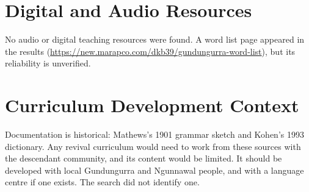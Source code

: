 \documentclass[12pt]{article}
\begin{document}
\section{Digital and Audio Resources}
No audio or digital teaching resources were found. A word list page appeared in the results (\url{https://new.marapco.com/dkb39/gundungurra-word-list}), but its reliability is unverified.

\section{Curriculum Development Context}
Documentation is historical: Mathews's 1901 grammar sketch and Kohen's 1993 dictionary. Any revival curriculum would need to work from these sources with the descendant community, and its content would be limited. It should be developed with local Gundungurra and Ngunnawal people, and with a language centre if one exists. The search did not identify one.
\end{document}

